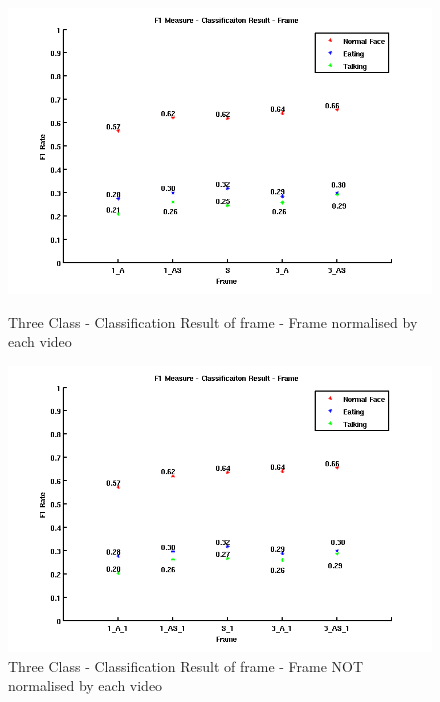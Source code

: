 \begin{figure}[ht]
\centering
\begin{minipage}{.5\textwidth}
  \centering
  \captionsetup{justification=centering,margin=1cm}
  \includegraphics[width=\linewidth]{imgs/Result_F1_Frame.png}
  \caption{Three Class - Classification Result of frame - Frame normalised by each video}
  \label{fig:RFF}
\end{minipage}%
\begin{minipage}{.5\textwidth}
  \centering
  \captionsetup{justification=centering,margin=1cm}
  \includegraphics[width=\linewidth]{imgs/Result_F1_Frame_1.png}
  \caption{Three Class - Classification Result of frame - Frame NOT normalised by each video}
  \label{fig:RFF1}
\end{minipage}
\end{figure}

